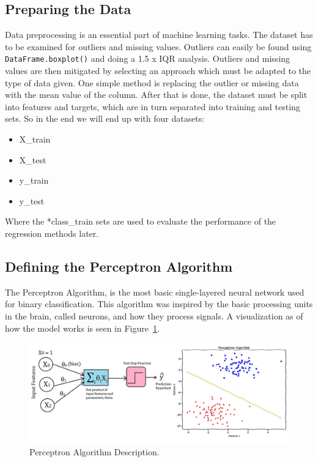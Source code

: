 \documentclass{CPSReport}
\begin{document}
\subsection{Preparing the Data}
Data preprocessing is an essential part of machine learning tasks. The dataset has to be examined for outliers and missing values. Outliers can easily be found using \texttt{DataFrame.boxplot()} and doing a 1.5 x IQR analysis. Outliers and missing values are then mitigated by selecting an approach which must be adapted to the type of data given. One simple method is replacing the outlier or missing data with the mean value of the column. After that is done, the dataset must be split into features and targets, which are in turn separated into training and testing sets. So in the end we will end up with four datasets:
\begin{itemize}
    \item X\_train
    \item X\_test
    \item y\_train
    \item y\_test
\end{itemize}
Where the *class\_train sets are used to evaluate the performance of the regression methods later.

\subsection{Defining the Perceptron Algorithm}
The Perceptron Algorithm, is the most basic single-layered neural network used for binary classification. This algorithm was inspired by the basic processing units in the brain, called neurons, and how they process signals. A visualization as of how the model works is seen in Figure~\ref{fig:perceptron}.
\begin{figure}[ht]
    \centering
    \includegraphics[width=.9\linewidth]{pics/perceptron.png}
    \caption{Perceptron Algorithm Description.}
    \label{fig:perceptron}
\end{figure}
\end{document}
